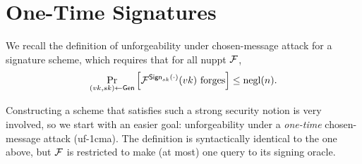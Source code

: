 \documentclass[11pt]{article}
\begin{document}
\thispagestyle{fancy}           %




\section{One-Time Signatures}
\label{sec:one-time-signatures}

We recall the definition of unforgeability under chosen-message attack
for a signature scheme, which requires that for all nuppt $\mathcal{F}$,
\[ \Pr_{(vk,sk) \gets \mathsf{Gen}} \left[ \mathcal{F}^{\mathsf{Sign}_{sk}(\cdot)}(vk)
  \text{ forges} \right] \leq \operatorname{negl}(n). \]

Constructing a scheme that satisfies such a strong security notion is
very involved, so we start with an easier goal: unforgeability under a
\emph{one-time} chosen-message attack (uf-1cma).  The definition is
syntactically identical to the one above, but $\mathcal{F}$ is restricted to
make (at most) one query to its signing oracle.

\newcommand{\ots}{\scheme{OTS}}
\end{document}
